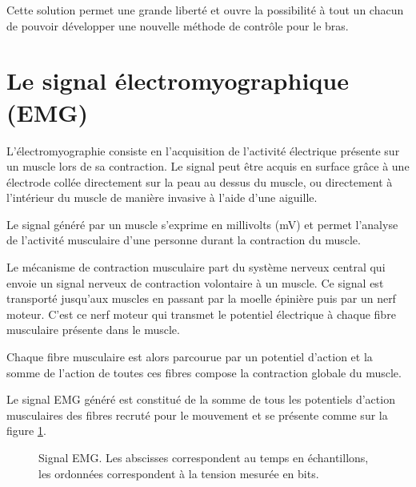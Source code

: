\documentclass[letterpaper, twoside, 12pt, memoire, creativecommons, hyperref]{thETS}
\begin{document}
Cette solution permet une grande liberté et ouvre la possibilité à tout un chacun de pouvoir développer une nouvelle méthode de contrôle pour le bras.

\section{Le signal électromyographique (EMG)}

L'électromyographie consiste en l'acquisition de l'activité électrique présente sur un muscle lors de sa contraction. Le signal peut être acquis en surface grâce à une électrode collée directement sur la peau au dessus du muscle, ou directement à l'intérieur du muscle de manière invasive à l'aide d'une aiguille.

Le signal généré par un muscle s'exprime en millivolts (mV) et permet l'analyse de l'activité musculaire d'une personne durant la contraction du muscle.

Le mécanisme de contraction musculaire part du système nerveux central qui envoie un signal nerveux de contraction volontaire à un muscle. Ce signal est transporté jusqu'aux muscles en passant par la moelle épinière puis par un nerf moteur. C'est ce nerf moteur qui transmet le potentiel électrique à chaque fibre musculaire présente dans le muscle. 

Chaque fibre musculaire est alors parcourue par un potentiel d'action et la somme de l'action de toutes ces fibres compose la contraction globale du muscle.

Le signal EMG généré est constitué de la somme de tous les potentiels d'action musculaires des fibres recruté pour le mouvement et se présente comme sur la figure \ref{fig:emg}.

\begin{figure}
	\centering
	\caption{Signal EMG. Les abscisses correspondent au temps en échantillons, les ordonnées correspondent à la tension mesurée en bits.}
	\label{fig:emg}
\end{figure}
\end{document}
